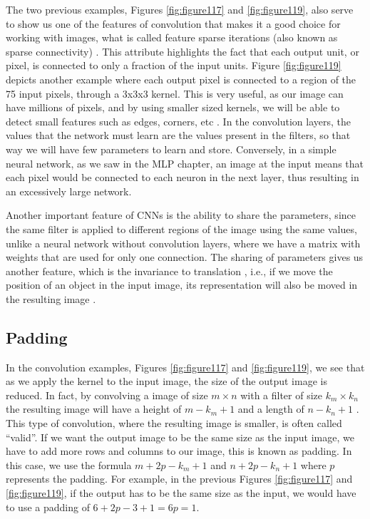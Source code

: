 The two previous examples, Figures \ref{fig:figure117} and \ref{fig:figure119}, also serve to show us one of the features of convolution that makes it a good choice for working with images, what is called feature sparse iterations (also known as sparse connectivity) \cite{goodfellow2016}. This attribute highlights the fact that each output unit, or pixel, is connected to only a fraction of the input units. Figure \ref{fig:figure119} depicts another example where each output pixel is connected to a region of the 75 input pixels, through a 3x3x3 kernel. This is very useful, as our image can have millions of pixels, and by using smaller sized kernels, we will be able to detect small features such as edges, corners, etc \cite{goodfellow2016}. In the convolution layers, the values that the network must learn are the values present in the filters, so that way we will have few parameters to learn and store. Conversely, in a simple neural network, as we saw in the MLP chapter, an image at the input means that each pixel would be connected to each neuron in the next layer, thus resulting in an excessively large network.

Another important feature of CNNs is the ability to share the parameters, since the same filter is applied to different regions of the image using the same values, unlike a neural network without convolution layers, where we have a matrix with weights that are used for only one connection. The sharing of parameters gives us another feature, which is the invariance to translation , i.e., if we move the position of an object in the input image, its representation will also be moved in the resulting image \cite{goodfellow2016}.

\subsection{Padding}

In the convolution examples, Figures \ref{fig:figure117} and \ref{fig:figure119}, we see that as we apply the kernel to the input image, the size of the output image is reduced. In fact, by convolving a image of size $m \times n$ with a filter of size $k_m \times k_n$ the resulting image will have a height of $m-k_m+1$ and a length of $n-k_n+1$ . This type of convolution, where the resulting image is smaller, is often called “valid”.
If we want the output image to be the same size as the input image, we have to add more rows and columns to our image, this is known as padding. In this case, we use the formula  $m+2p-k_m+1$ and $n+2p-k_n+1$ where $p$ represents the padding. For example, in the previous Figures \ref{fig:figure117} and \ref{fig:figure119}, if the output has to be the same size as the input, we would have to use a padding of $6+2p-3+1=6p=1$.

